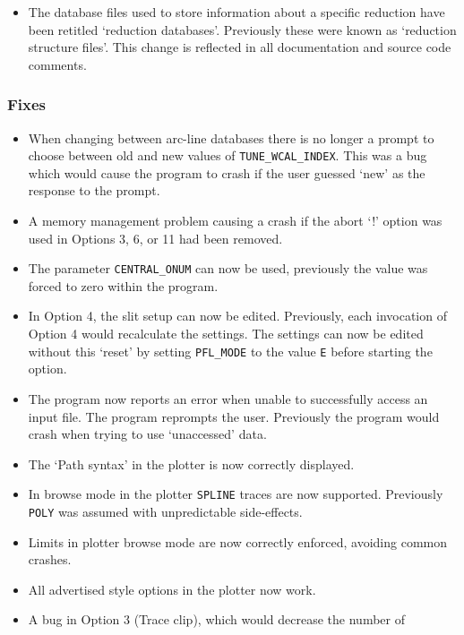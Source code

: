 \documentclass[11pt,twoside]{article}
\newcommand{\htmlref}[2]{#1}
\begin{document}
\begin{itemize}
\item The database files used to store information about a specific
   reduction have been retitled `reduction databases'.  Previously
   these were known as `reduction structure files'.  This change is
   reflected in all documentation and source code comments.
\end{itemize}

\subsubsection{Fixes}

\begin{itemize}
\item When changing between arc-line databases there is no longer
   a prompt to choose between old and new values of
   \htmlref{{\tt{TUNE\_WCAL\_INDEX}}}{par_TUNE_WCAL_INDEX}.
   This was a bug which would cause the program to crash if the user
   guessed `new' as the response to the prompt.
\item A memory management problem causing a crash if the abort `!'
   option was used in Options 3, 6, or 11 had been removed.
\item The parameter \htmlref{{\tt{CENTRAL\_ONUM}}}{par_CENTRAL_ONUM}
   can now be used, previously the
   value was forced to zero within the program.
\item In Option 4, the slit setup can now be edited.  Previously,
   each invocation of Option 4 would recalculate the settings.
   The settings can now be edited without this `reset' by setting
   \htmlref{{\tt{PFL\_MODE}}}{par_PFL_MODE} to the value \texttt{E}
   before starting the option.
\item The program now reports an error when unable to successfully
   access an input file.  The program reprompts the user.
   Previously the program would crash when trying to use `unaccessed'
   data.
\item The `Path syntax' in the plotter is now correctly displayed.
\item In browse mode in the plotter \texttt{SPLINE} traces are now supported.
   Previously \texttt{POLY} was assumed with unpredictable side-effects.
\item Limits in plotter browse mode are now correctly enforced, avoiding
   common crashes.
\item All advertised style options in the plotter now work.
\item A bug in Option 3 (Trace clip), which would decrease the number of

\end{itemize}
\end{document}
